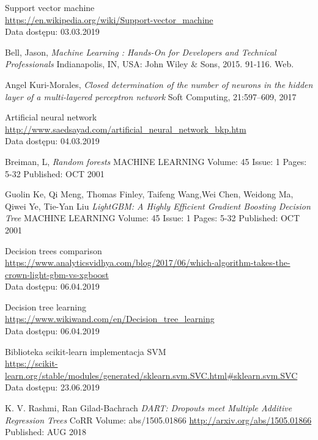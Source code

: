 \documentclass[a4paper, twoside, 11pt, openright]{article}
\begin{document}
\begin{thebibliography}{9}
	Support vector machine
	\\\url{https://en.wikipedia.org/wiki/Support-vector_machine} 
	\\Data dostępu: 03.03.2019

	Bell, Jason, \textit{Machine Learning : Hands-On for Developers and Technical Professionals}  Indianapolis, IN, USA: John Wiley \& Sons, 2015. 91-116. Web.


	Angel Kuri-Morales, 
  \textit{Closed determination of the number of neurons in the hidden layer of a multi-layered perceptron network}
  Soft Computing, 21:597–609, 2017

	Artificial neural network
	\\\url{http://www.saedsayad.com/artificial_neural_network_bkp.htm} 
	\\Data dostępu: 04.03.2019

	Breiman, L, 
  \textit{Random forests}
	MACHINE LEARNING  Volume: 45   Issue: 1   Pages: 5-32   Published: OCT 2001

Guolin Ke, Qi Meng, Thomas Finley, Taifeng Wang,Wei Chen, Weidong Ma, Qiwei Ye, Tie-Yan Liu
  \textit{LightGBM: A Highly Efficient Gradient Boosting Decision Tree}
	MACHINE LEARNING  Volume: 45   Issue: 1   Pages: 5-32   Published: OCT 2001



	Decision trees comparison
	\\\url{https://www.analyticsvidhya.com/blog/2017/06/which-algorithm-takes-the-crown-light-gbm-vs-xgboost} 
	\\Data dostępu: 06.04.2019


	Decision tree learning
	\\\url{https://www.wikiwand.com/en/Decision_tree_learning} 
	\\Data dostępu: 06.04.2019

	Biblioteka scikit-learn implementacja SVM
	\\\url{https://scikit-learn.org/stable/modules/generated/sklearn.svm.SVC.html#sklearn.svm.SVC}
	\\Data dostępu: 23.06.2019

	K. V. Rashmi, Ran Gilad-Bachrach
	\textit{DART: Dropouts meet Multiple Additive Regression Trees}
	CoRR Volume: abs/1505.01866 \url{http://arxiv.org/abs/1505.01866} Published: AUG 2018

\end{thebibliography}
\end{document}
